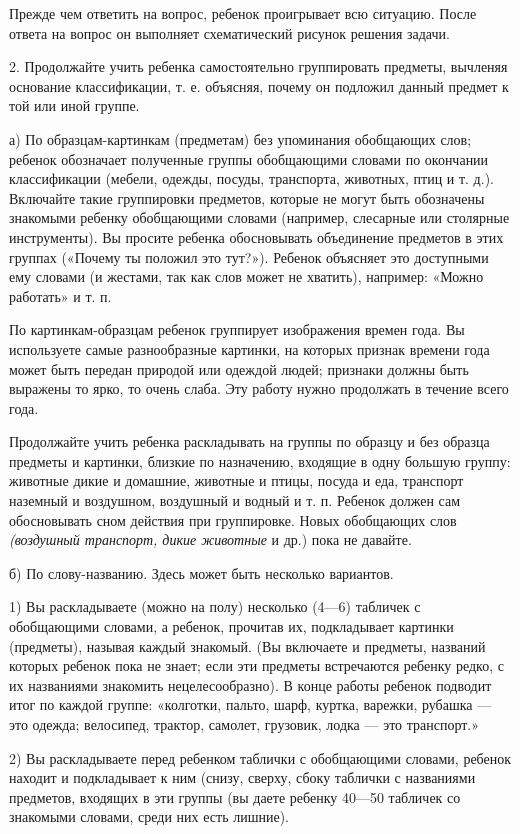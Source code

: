\documentclass[a5paper]{book}
\renewcommand{\emph}[1]{\textit{#1}}
\begin{document}
Прежде чем ответить на вопрос, ребенок проигрывает всю ситуацию. После
ответа на вопрос он выполняет схематический рисунок решения задачи.

2. Продолжайте учить ребенка самостоятельно группировать предметы,
вычленяя основание классификации, т. е. объясняя, почему он подложил
данный предмет к той или иной группе.

а) По образцам-картинкам (предметам) без упоминания обобщающих слов;
ребенок обозначает полученные группы обобщающими словами по окончании
классификации (мебели, одежды, посуды, транспорта, животных, птиц и т.
д.). Включайте такие группировки предметов, которые не могут быть
обозначены знакомыми ребенку обобщающими словами (например, слесарные
или столярные инструменты). Вы просите ребенка обосновывать объединение
предметов в этих группах («Почему ты положил это тут?»). Ребенок
объясняет это доступными ему словами (и жестами, так как слов может не
хватить), например: «Можно работать» и т. п.

По картинкам-образцам ребенок группирует изображения времен года. Вы
используете самые разнообразные картинки, на которых признак времени
года может быть передан природой или одеждой людей; признаки должны быть
выражены то ярко, то очень слаба. Эту работу нужно продолжать в течение
всего года.

Продолжайте учить ребенка раскладывать на группы по образцу и без
образца предметы и картинки, близкие по назначению, входящие в одну
большую группу: животные дикие и домашние, животные и птицы, посуда и
еда, транспорт наземный и воздушном, воздушный и водный и т. п. Ребенок
должен сам обосновывать сном действия при группировке. Новых обобщающих
слов \emph{(воздушный транспорт, дикие животные} и др.) пока не давайте.

б) По слову-названию. Здесь может быть несколько вариантов.

1) Вы раскладываете (можно на полу) несколько (4---6) табличек с
обобщающими словами, а ребенок, прочитав их, подкладывает картинки
(предметы), называя каждый знакомый. (Вы включаете и предметы, названий
которых ребенок пока не знает; если эти предметы встречаются ребенку
редко, с их названиями знакомить нецелесообразно). В конце работы
ребенок подводит итог по каждой группе: «колготки, пальто, шарф, куртка,
варежки, рубашка --- это одежда; велосипед, трактор, самолет, грузовик,
лодка --- это транспорт.»

2) Вы раскладываете перед ребенком таблички с обобщающими словами,
ребенок находит и подкладывает к ним (снизу, сверху, сбоку таблички с
названиями предметов, входящих в эти группы (вы даете ребенку 40---50
табличек со знакомыми словами, среди них есть лишние).
\end{document}
